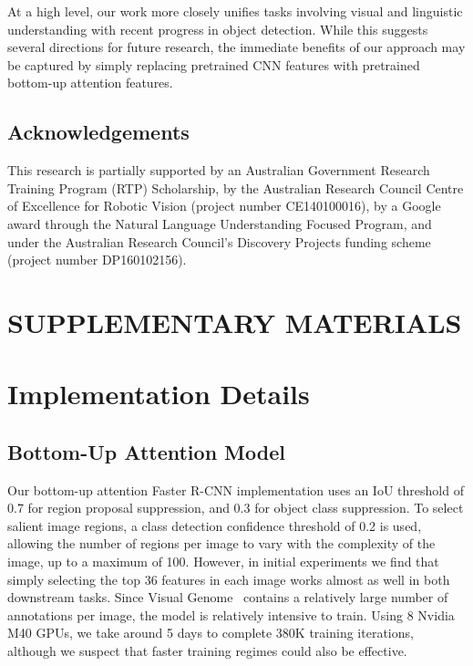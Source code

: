 \documentclass[10pt,twocolumn,letterpaper]{article}
\begin{document}
At a high level, our work more closely unifies tasks involving visual and linguistic understanding with recent progress in object detection. While this suggests several directions for future research, the immediate benefits of our approach may be captured by simply replacing pretrained CNN features with pretrained bottom-up attention features.  

\subsection*{Acknowledgements}
\small
\noindent
This research is partially supported by an Australian Government Research Training Program (RTP) Scholarship, by the Australian Research Council Centre of Excellence for Robotic Vision (project number CE140100016), by a Google award through the Natural Language Understanding Focused Program, and under the Australian Research Council’s Discovery Projects funding scheme (project number DP160102156).


{\small


}

\newpage

\section*{SUPPLEMENTARY MATERIALS}

\section{Implementation Details}

\subsection{Bottom-Up Attention Model}

Our bottom-up attention Faster R-CNN implementation uses an IoU threshold of 0.7 for region proposal suppression, and 0.3 for object class suppression. To select salient image regions, a class detection confidence threshold of 0.2 is used, allowing the number of regions per image  to vary with the complexity of the image, up to a maximum of 100. However, in initial experiments we find that simply selecting the top 36 features in each image works almost as well in both downstream tasks. Since Visual Genome~\cite{krishnavisualgenome} contains a relatively large number of annotations per image, the model is relatively intensive to train. Using 8 Nvidia M40 GPUs, we take around 5 days to complete 380K training iterations, although we suspect that faster training regimes could also be effective.
\end{document}
